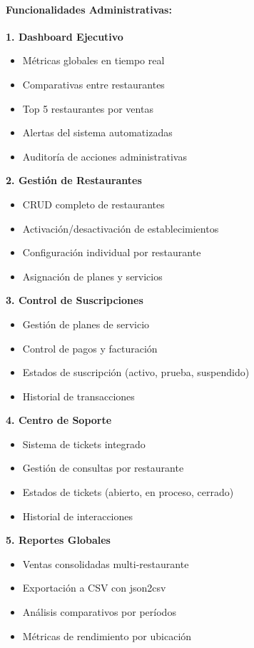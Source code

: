 \documentclass[12pt,a4paper]{article}
\begin{document}
\paragraph{Funcionalidades Administrativas:}

\textbf{1. Dashboard Ejecutivo}
\begin{itemize}
    \item Métricas globales en tiempo real
    \item Comparativas entre restaurantes
    \item Top 5 restaurantes por ventas
    \item Alertas del sistema automatizadas
    \item Auditoría de acciones administrativas
\end{itemize}

\textbf{2. Gestión de Restaurantes}
\begin{itemize}
    \item CRUD completo de restaurantes
    \item Activación/desactivación de establecimientos
    \item Configuración individual por restaurante
    \item Asignación de planes y servicios
\end{itemize}

\textbf{3. Control de Suscripciones}
\begin{itemize}
    \item Gestión de planes de servicio
    \item Control de pagos y facturación
    \item Estados de suscripción (activo, prueba, suspendido)
    \item Historial de transacciones
\end{itemize}

\textbf{4. Centro de Soporte}
\begin{itemize}
    \item Sistema de tickets integrado
    \item Gestión de consultas por restaurante
    \item Estados de tickets (abierto, en proceso, cerrado)
    \item Historial de interacciones
\end{itemize}

\textbf{5. Reportes Globales}
\begin{itemize}
    \item Ventas consolidadas multi-restaurante
    \item Exportación a CSV con json2csv
    \item Análisis comparativos por períodos
    \item Métricas de rendimiento por ubicación
\end{itemize}
\end{document}
